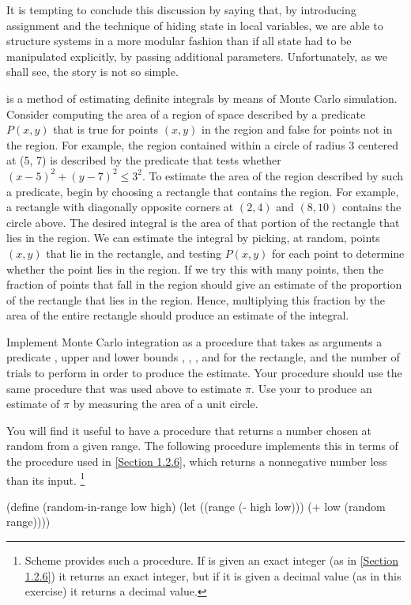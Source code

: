 It is tempting to conclude this discussion by saying that, by introducing assignment and the technique of hiding state in local variables, we are able to structure systems in a more modular fashion than if all state had to be manipulated explicitly, by passing additional parameters.
Unfortunately, as we shall see, the story is not so simple.

\begin{exercise}
	\label{Exercise 3.5}
	 is a method of estimating definite integrals by means of Monte Carlo simulation.
	Consider computing the area of a region of space described by a predicate \( P(x, y) \) that is true for points \( (x, y) \) in the region and false for points not in the region.
	For example, the region contained within a circle of radius 3 centered at (5, 7) is described by the predicate that tests whether \( (x - 5)^2 + (y - 7)^2 ≤ 3^2 \).
	To estimate the area of the region described by such a predicate, begin by choosing a rectangle that contains the region.
	For example, a rectangle with diagonally opposite corners at \( (2, 4) \) and \( (8, 10) \) contains the circle above.
	The desired integral is the area of that portion of the rectangle that lies in the region.
	We can estimate the integral by picking, at random, points \( (x, y) \) that lie in the rectangle, and testing \( P(x, y) \) for each point to determine whether the point lies in the region.
	If we try this with many points, then the fraction of points that fall in the region should give an estimate of the proportion of the rectangle that lies in the region.
	Hence, multiplying this fraction by the area of the entire rectangle should produce an estimate of the integral.

	Implement Monte Carlo integration as a procedure  that takes as arguments a predicate , upper and lower bounds , , , and  for the rectangle, and the number of trials to perform in order to produce the estimate.
	Your procedure should use the same  procedure that was used above to estimate \( π \).
	Use your  to produce an estimate of \( π \) by measuring the area of a unit circle.

	You will find it useful to have a procedure that returns a number chosen at random from a given range.
	The following  procedure implements this in terms of the  procedure used in \cref{Section 1.2.6}, which returns a nonnegative number less than its input.%
	\footnote{
		 Scheme provides such a procedure.
		If  is given an exact integer (as in \cref{Section 1.2.6}) it returns an exact integer, but if it is given a decimal value (as in this exercise) it returns a decimal value.
	}
	\begin{scheme}
	  (define (random-in-range low high)
	    (let ((range (- high low)))
	      (+ low (random range))))
	\end{scheme}
\end{exercise}




